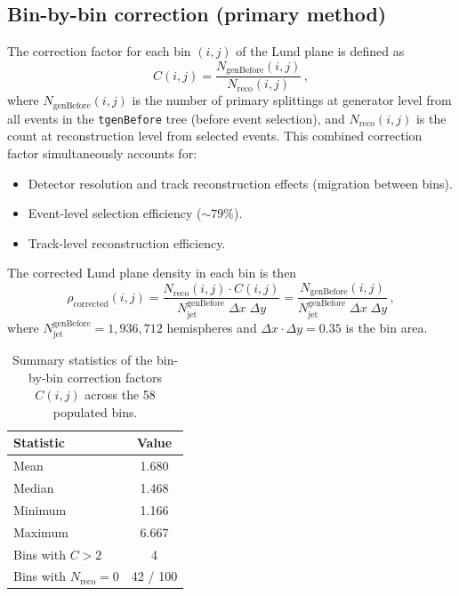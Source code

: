 \documentclass[11pt,a4paper]{article}
\begin{document}
\subsection{Bin-by-bin correction (primary method)}
\label{sec:bbb}

The correction factor for each bin $(i,j)$ of the Lund plane is
defined as
\begin{equation}
  C(i,j) = \frac{N_\text{genBefore}(i,j)}{N_\text{reco}(i,j)}\,,
  \label{eq:correction}
\end{equation}
where $N_\text{genBefore}(i,j)$ is the number of primary splittings at
generator level from all events in the \texttt{tgenBefore} tree (before
event selection), and $N_\text{reco}(i,j)$ is the count at reconstruction
level from selected events.  This combined correction factor
simultaneously accounts for:
\begin{itemize}
\item Detector resolution and track reconstruction effects
  (migration between bins).
\item Event-level selection efficiency ($\sim\!79\%$).
\item Track-level reconstruction efficiency.
\end{itemize}

The corrected Lund plane density in each bin is then
\begin{equation}
  \rho_\text{corrected}(i,j) =
  \frac{N_\text{reco}(i,j) \cdot C(i,j)}
       {N_\text{jet}^\text{genBefore}\;\Delta x\;\Delta y}
  = \frac{N_\text{genBefore}(i,j)}
         {N_\text{jet}^\text{genBefore}\;\Delta x\;\Delta y}\,,
  \label{eq:corrected-density}
\end{equation}
where $N_\text{jet}^\text{genBefore} = 1{,}936{,}712$ hemispheres and
$\Delta x \cdot \Delta y = 0.35$ is the bin area.

\begin{table}[htbp]
\centering
\caption{Summary statistics of the bin-by-bin correction factors
  $C(i,j)$ across the 58 populated bins.}
\label{tbl:correction-stats}
\begin{tabular}{lc}
\toprule
Statistic & Value \\
\midrule
Mean & 1.680 \\
Median & 1.468 \\
Minimum & 1.166 \\
Maximum & 6.667 \\
Bins with $C > 2$ & 4 \\
Bins with $N_\text{reco} = 0$ & 42 / 100 \\
\bottomrule
\end{tabular}
\end{table}
\end{document}
